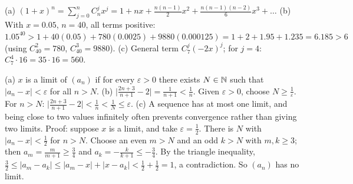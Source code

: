 (a) $(1+x)^n=\sum_{j=0}^nC_n^jx^j=1+nx+\frac{n(n-1)}2x^2+\frac{n(n-1)(n-2)}6x^3+\dots$
(b) With $x=0.05$, $n=40$, all terms positive:
$1.05^{40}>1+40(0.05)+780(0.0025)+9880(0.000125)=1+2+1.95+1.235=6.185>6$
(using $C_{40}^2=780$, $C_{40}^3=9880$).
(c) General term $C_7^j(-2x)^j$; for $j=4$: $C_7^4\cdot16=35\cdot16=560$.

(a) $x$ is a limit of $(a_n)$ if for every $\varepsilon>0$ there exists $N\in\mathbb{N}$ such that $|a_n-x|<\varepsilon$ for all $n>N$.
(b) $\big|\frac{2n+3}{n+1}-2\big|=\frac{1}{n+1}<\frac1n$. Given $\varepsilon>0$, choose $N\ge\frac1\varepsilon$. For $n>N$:
$\big|\frac{2n+3}{n+1}-2\big|<\frac1n<\frac1N\le\varepsilon$.
(c) A sequence has at most one limit, and being close to two values infinitely often prevents convergence rather than
giving two limits. Proof: suppose $x$ is a limit, and take $\varepsilon=\tfrac12$. There is $N$ with $|a_n-x|<\tfrac12$ for $n>N$.
Choose an even $m>N$ and an odd $k>N$ with $m,k\ge3$; then $a_m=\frac m{m+1}\ge\tfrac34$ and $a_k=-\frac{k}{k+1}\le-\tfrac34$. By the
triangle inequality, $\tfrac32\le|a_m-a_k|\le|a_m-x|+|x-a_k|<\tfrac12+\tfrac12=1$, a contradiction. So $(a_n)$ has no limit.
